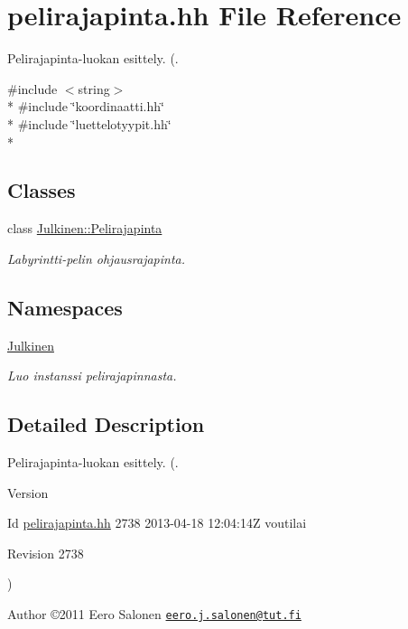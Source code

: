 \hypertarget{pelirajapinta_8hh}{}\section{pelirajapinta.\+hh File Reference}
\label{pelirajapinta_8hh}


Pelirajapinta-\/luokan esittely. (.  


{\ttfamily \#include $<$string$>$}\\*
{\ttfamily \#include \char`\"{}koordinaatti.\+hh\char`\"{}}\\*
{\ttfamily \#include \char`\"{}luettelotyypit.\+hh\char`\"{}}\\*
\subsection*{Classes}
\begin{DoxyCompactItemize}
\item 
class \hyperlink{class_julkinen_1_1_pelirajapinta}{Julkinen\+::\+Pelirajapinta}
\begin{DoxyCompactList}\small\item\em Labyrintti-\/pelin ohjausrajapinta. \end{DoxyCompactList}\end{DoxyCompactItemize}
\subsection*{Namespaces}
\begin{DoxyCompactItemize}
\item 
 \hyperlink{namespace_julkinen}{Julkinen}
\begin{DoxyCompactList}\small\item\em Luo instanssi pelirajapinnasta. \end{DoxyCompactList}\end{DoxyCompactItemize}


\subsection{Detailed Description}
Pelirajapinta-\/luokan esittely. (. 

\begin{DoxyVersion}{Version}

\end{DoxyVersion}
\begin{DoxyParagraph}{Id}
\hyperlink{pelirajapinta_8hh}{pelirajapinta.\+hh} 2738 2013-\/04-\/18 12\+:04\+:14\+Z voutilai 
\end{DoxyParagraph}


\begin{DoxyParagraph}{Revision}
2738 
\end{DoxyParagraph}
) \begin{DoxyAuthor}{Author}
©2011 Eero Salonen \href{mailto:eero.j.salonen@tut.fi}{\tt eero.\+j.\+salonen@tut.\+fi} 
\end{DoxyAuthor}
